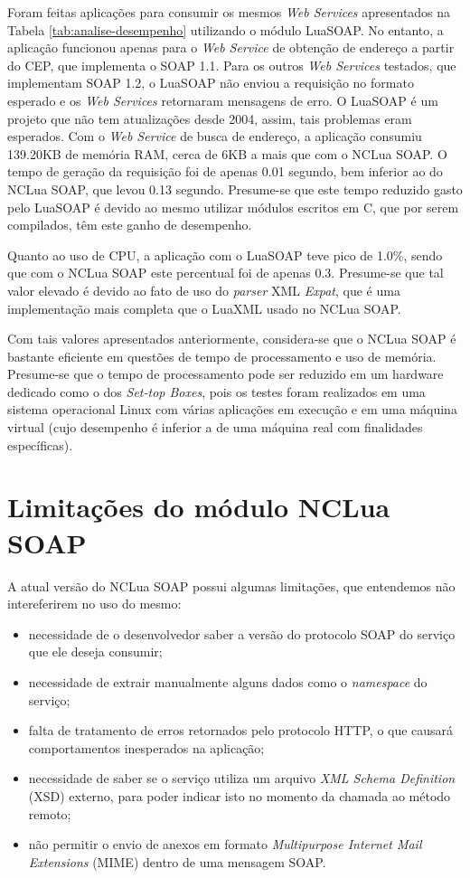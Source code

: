 Foram feitas aplicações para consumir os mesmos \textit{Web Services} apresentados
na Tabela \ref{tab:analise-desempenho} utilizando o módulo LuaSOAP. No entanto, 
a aplicação funcionou apenas para o \textit{Web Service} de obtenção de endereço
a partir do CEP, que implementa o SOAP 1.1. Para os outros \textit{Web Services} testados,
que implementam SOAP 1.2, o LuaSOAP não enviou a requisição no formato
esperado e os \textit{Web Services} retornaram mensagens de erro.
O LuaSOAP é um projeto que não tem atualizações desde 2004, assim,
tais problemas eram esperados.
Com o \textit{Web Service} de busca de endereço, a aplicação consumiu 
139.20KB de memória RAM, cerca de 6KB a mais que com o NCLua SOAP.
O tempo de geração da requisição foi de apenas 0.01 segundo, bem inferior
ao do NCLua SOAP, que levou 0.13 segundo. Presume-se que este tempo
reduzido gasto pelo LuaSOAP é devido ao mesmo utilizar módulos escritos 
em C, que por serem compilados, têm este ganho de desempenho.

Quanto ao uso de CPU, a aplicação com o LuaSOAP teve pico de 1.0\%, sendo que com o NCLua SOAP
este percentual foi de apenas 0.3. Presume-se que tal valor elevado é devido
ao fato de uso do \textit{parser} XML \textit{Expat}, que é uma implementação mais
completa que o LuaXML usado no NCLua SOAP.

Com tais valores apresentados anteriormente, considera-se que o NCLua SOAP é bastante eficiente
em questões de tempo de processamento e uso de memória. 
Presume-se que o tempo de processamento pode ser reduzido em
um hardware dedicado como o dos \textit{Set-top Boxes}, pois os testes
foram realizados em uma sistema operacional Linux com várias aplicações
em execução e em uma máquina virtual (cujo desempenho é inferior a de uma máquina real
com finalidades específicas).

\section{Limitações do módulo NCLua SOAP}

A atual versão do NCLua SOAP possui algumas limitações, que entendemos não intereferirem no uso do mesmo:

\begin{itemize}
	\item necessidade de o desenvolvedor saber a versão do protocolo SOAP do serviço que ele deseja consumir;
  \item necessidade de extrair manualmente alguns dados como o \textit{namespace} do serviço;
  \item falta de tratamento de erros retornados pelo protocolo HTTP, o que causará comportamentos
  inesperados na aplicação;
  \item necessidade de saber se o serviço utiliza um arquivo \textit{XML Schema Definition} (XSD) externo,
        para poder indicar isto no momento da chamada ao método remoto;
  \item não permitir o envio de anexos em formato \textit{Multipurpose Internet Mail Extensions} (MIME)\cite{rfc2045} 
  dentro de uma mensagem SOAP.
\end{itemize}

